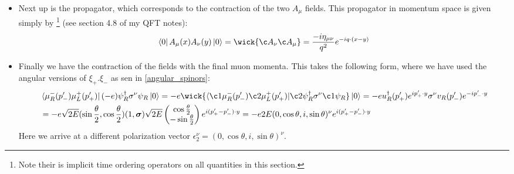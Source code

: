 \documentclass[11pt]{article}
\numberwithin{equation}{section}
\begin{document}
\begin{itemize}
    \item Next up is the propagator, which corresponds to the contraction of the two $A_{\mu}$ fields. This propagator in momentum space is given simply by \footnote{Note their is implicit time ordering operators on all quantities in this section. } (see section 4.8 of my QFT notes):
    \begin{align*}
       \bra{0} A_{\mu}(x) A_{\nu}(y)\ket{0}=\wick{\c A_{\nu}\c A_{\mu}} = \frac{-i\eta_{\mu\nu}}{q^2}e^{-iq \cdot (x - y)}
     \end{align*}
     \item Finally we have the contraction of the fields with the final muon momenta. This takes the following form, where we have used the angular versions of $\xi_+.\xi_-$ as sen in \ref{angular_spinors}:  
     \begin{align*}
         &\bra{\mu_R^{-}(p_-')\mu_L^{+}(p_+')}(- e)\psi^{\dagger}_R\sigma^{\nu}\psi_R \ket{0}=-e \wick{  \langle \c1\mu_R^{-}(p_-')\c2 \mu_L^{+}(p_+')| \c2 \psi^{\dagger}_R\sigma^{\nu}\c1 \psi_R}\ket{0} = -eu^{\dagger}_R(p_+')e^{ip_{+}'\cdot y}\sigma^{\nu}v_R(p_-')e^{-ip_-'\cdot y} \\
         & = -e \sqrt{2E}(\sin \frac{\theta}{2} , \cos \frac{\theta}{2}) (1,\boldsymbol{\sigma})\sqrt{2E}\begin{pmatrix}
             \cos \frac{\theta}{2} \\ -\sin \frac{\theta}{2}
         \end{pmatrix} e^{i(p_+'-p_-')\cdot y} = -e2E( 0, \cos \theta, i, \sin \theta)^{\nu}e^{i(p_+'-p_-')\cdot y}
     \end{align*}
     Here we arrive at a different polarization vector $\epsilon_2^{\nu} = ( 0, \cos \theta, i, \sin \theta)^{\nu}$. 


\end{itemize}
\end{document}
